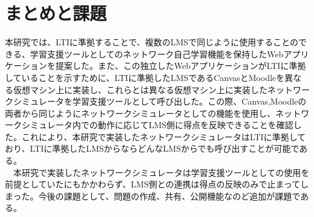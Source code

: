 \section{まとめと課題}
\label{tag:summary}
本研究では、LTIに準拠することで、複数のLMSで同じように使用することのできる、学習支援ツールとしてのネットワーク自己学習機能を保持したWebアプリケーションを提案した。また、この独立したWebアプリケーションがLTIに準拠していることを示すために、LTIに準拠したLMSであるCanvasとMoodleを異なる仮想マシン上に実装し、これらとは異なる仮想マシン上に実装したネットワークシミュレータを学習支援ツールとして呼び出した。この際、Canvas,Moodleの両者から同じようにネットワークシミュレータとしての機能を使用し、ネットワークシミュレータ内での動作に応じてLMS側に得点を反映できることを確認した。これにより、本研究で実装したネットワークシミュレータはLTIに準拠しており、LTIに準拠したLMSからならどんなLMSからでも呼び出すことが可能である。\\
　本研究で実装したネットワークシミュレータは学習支援ツールとしての使用を前提としていたにもかかわらず、LMS側との連携は得点の反映のみで止まってしまった。今後の課題として、問題の作成、共有、公開機能なのど追加が課題である。
